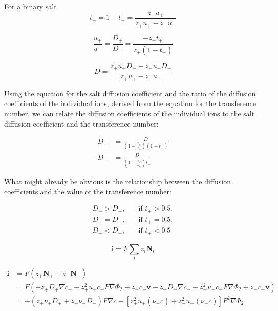 \documentclass[12pt]{article}
\newcommand{\flux}{\mathrm{\mathbf{N}}}
\newcommand{\vel}{\mathrm{\mathbf{v}}}
\newcommand{\solcur}{\mathrm{\mathbf{i}}}
\begin{document}
	For a binary salt
	\begin{equation}
		t_+ = 1 - t_- = \frac{z_+ u_+}{z_+ u_+ - z_- u_-}
	\end{equation}

	\begin{equation}
		\frac{u_+}{u_-} = \frac{D_+}{D_-} = \frac{-z_- t_+}{z_+ (1 - t_+)}
	\end{equation}	

	\begin{equation} %
		D = \frac{z_+ u_+ D_- - z_- u_- D_+}{z_+ u_+ - z_- u_-}
	\end{equation}

	Using the equation for the salt diffusion coefficient and the ratio of the diffusion coefficients of the individual ions, derived from the equation for the transference number, we can relate the diffusion coefficients of the individual ions to the salt diffusion coefficient and the transference number:

	\begin{align} 
		D_+ &= \frac{D}{\left(1 - \frac{z_+}{z_-} \right)(1 - t_+)}
		\\
		D_- &= \frac{D}{\left(1 - \frac{z_-}{z_+} \right) t_+}
	\end{align}

	What might already be obvious is the relationship between the diffusion coefficients and the value of the transference number:

	\begin{align*}
		D_+ > D_-,& \quad \text{if } t_{+} > 0.5, \\
		D_+ = D_-,& \quad \text{if } t_+ = 0.5, \\
		D_+ < D_-,& \quad \text{if } t_+ < 0.5
	\end{align*}	


	\begin{equation}
		\solcur = F \sum_i z_i \flux_i
	\end{equation}

	\begin{align*}
		\solcur &= F(z_+ \flux_+ + z_- \flux_-) 
		\\
		&= F (-z_+ D_+ \nabla c_+ - z_+^2 u_+ c_+ F \nabla \Phi_2 + z_+ c_+ \vel
		   - z_- D_- \nabla c_- - z_-^2 u_- c_- F \nabla \Phi_2 + z_- c_- \vel)
		\\
		&= -\left(z_+ \nu_+ D_+ + z_- \nu_- D_- \right) F \nabla c
			- \left[ z_+^2 u_+ (\nu_+ c) + z_-^2 u_- (\nu_- c) \right] F^2 \nabla \Phi_2
	\end{align*}
\end{document}
